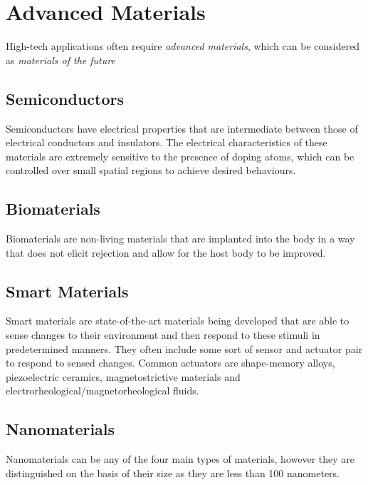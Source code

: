 \documentclass{article}
\begin{document}
\section{Advanced Materials}

High-tech applications often require \textit{advanced materials}, which can be considered as \textit{materials of the future}

\subsection{Semiconductors}

Semiconductors have electrical properties that are intermediate between those of electrical conductors and insulators. The electrical characteristics of these materials are extremely sensitive to the presence of doping atoms, which can be controlled over small spatial regions to achieve desired behaviours.

\subsection{Biomaterials}

Biomaterials are non-living materials that are implanted into the body in a way that does not elicit rejection and allow for the host body to be improved.

\subsection{Smart Materials}

Smart materials are state-of-the-art materials being developed that are able to sense changes to their environment and then respond to these stimuli in predetermined manners. They often include some sort of sensor and actuator pair to respond to sensed changes. Common actuators are shape-memory alloys, piezoelectric ceramics, magnetostrictive materials and electrorheological/magnetorheological fluids.

\subsection{Nanomaterials}

Nanomaterials can be any of the four main types of materials, however they are distinguished on the basis of their size as they are less than 100 nanometers. 
\end{document}
